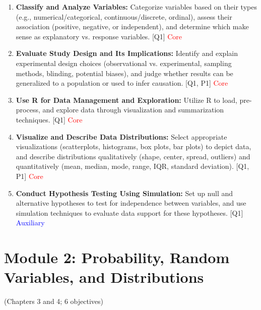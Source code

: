 \documentclass[12pt]{article}
\begin{document}
\begin{enumerate}
    \item \textbf{Classify and Analyze Variables:} Categorize variables based on their types (e.g., numerical/categorical, continuous/discrete, ordinal), assess their association (positive, negative, or independent), and determine which make sense as explanatory vs. response variables. [Q1] \textcolor{red}{Core}
    \item \textbf{Evaluate Study Design and Its Implications:} Identify and explain experimental design choices (observational vs. experimental, sampling methods, blinding, potential biases), and judge whether results can be generalized to a population or used to infer causation. [Q1, P1] \textcolor{red}{Core}
    \item \textbf{Use R for Data Management and Exploration:} Utilize R to load, pre-process, and explore data through visualization and summarization techniques. [Q1] \textcolor{red}{Core}
    \item \textbf{Visualize and Describe Data Distributions:} Select appropriate visualizations (scatterplots, histograms, box plots, bar plots) to depict data, and describe distributions qualitatively (shape, center, spread, outliers) and quantitatively (mean, median, mode, range, IQR, standard deviation). [Q1, P1] \textcolor{red}{Core}
    \item \textbf{Conduct Hypothesis Testing Using Simulation:} Set up null and alternative hypotheses to test for independence between variables, and use simulation techniques to evaluate data support for these hypotheses. [Q1] \textcolor{blue}{Auxiliary}
\end{enumerate}

\newpage


\section{Module 2: Probability, Random Variables, and Distributions}
(Chapters 3 and 4; 6 objectives)

\end{document}
